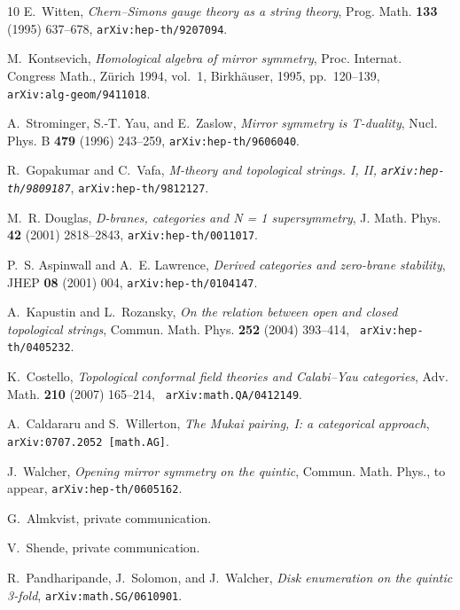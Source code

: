 \begin{thebibliography}{10}
E.~Witten, {\em {C}hern--{S}imons gauge theory as a string theory}, Prog. Math.
  {\bf 133} (1995) 637--678, {\tt arXiv:hep-th/9207094}.

M.~Kontsevich, {\em Homological algebra of mirror symmetry}, Proc. Internat.
  Congress Math., Z\"urich 1994, vol.~1, Birkh\"auser, 1995, pp.~120--139, {\tt
  arXiv:alg-geom/9411018}.

A.~Strominger, S.-T. Yau, and E.~Zaslow, {\em Mirror symmetry is {T}-duality},
  Nucl. Phys. B {\bf 479} (1996) 243--259, {\tt arXiv:hep-th/9606040}.

R.~Gopakumar and C.~Vafa, {\em M-theory and topological strings. {I}, {II},
  {{\tt arXiv:hep-th/9809187}}}, {\tt arXiv:hep-th/9812127}.

M.~R. Douglas, {\em D-branes, categories and {N = 1} supersymmetry}, J. Math.
  Phys. {\bf 42} (2001) 2818--2843, {\tt arXiv:hep-th/0011017}.

P.~S. Aspinwall and A.~E. Lawrence, {\em Derived categories and zero-brane
  stability}, JHEP {\bf 08} (2001) 004, {\tt arXiv:hep-th/0104147}.

A.~Kapustin and L.~Rozansky, {\em On the relation between open and closed
  topological strings}, Commun. Math. Phys. {\bf 252} (2004) 393--414, {\tt
  arXiv:hep-th/0405232}.

K.~Costello, {\em Topological conformal field theories and {C}alabi--{Y}au
  categories}, Adv. Math. {\bf 210} (2007) 165--214, {\tt
  arXiv:math.QA/0412149}.

A.~Caldararu and S.~Willerton, {\em The {M}ukai pairing, {I}: a categorical
  approach}, {\tt arXiv:0707.2052 [math.AG]}.

J.~Walcher, {\em Opening mirror symmetry on the quintic}, Commun. Math. Phys.,
  to appear, {\tt arXiv:hep-th/0605162}.

G.~Almkvist, private communication.

V.~Shende, private communication.

R.~Pandharipande, J.~Solomon, and J.~Walcher, {\em Disk enumeration on the
  quintic 3-fold}, {\tt arXiv:math.SG/0610901}.


\end{thebibliography}
